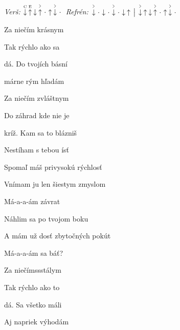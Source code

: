 \begin{song}


 \quad
\textit{Verš:} $\PluckDown{C}\PluckUp{E}\Down\AccentUp\Miss\Up\AccentDown\Miss$ \quad
\textit{Refrén:} $\AccentDown\Miss\Down\Miss\AccentDown\Miss\Down\Up \Separator \AccentDown\Up\Down\AccentUp\Miss\Up\AccentDown\Miss$

\large


\large

\bigskip


 Za niečím krásnym \par
{} Tak rýchlo ako sa \par
{}dá. Do tvojích básní \par
{}márne rým hľadám \par

\bigskip

 Za niečím zvláštnym \par
{} Do záhrad kde nie je \par
{}kríž. Kam sa to blázniš \par
Nestíham s tebou ísť \par

\bigskip

Spomaľ máš privysokú rýchlosť \par
{}Vnímam ju len šiestym zmyslom \par
{}Má-a-a-ám závrat  \par

\bigskip

Náhlim sa po tvojom boku \par
A mám už dosť zbytočných pokút \par
{}Má-a-a-ám sa báť?  \par

\bigskip

 Za niečímssstálym \par
{} Tak rýchlo ako to \par
{}dá. Sa všetko máli \par
Aj napriek výhodám \par


\end{song}
